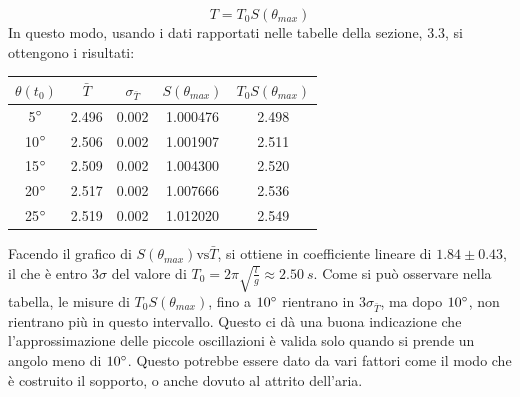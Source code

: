 \documentclass[a4paper]{article}
\begin{document}
\begin{equation}
    T = T_0 S(\theta_{max})
\end{equation}
In questo modo, usando i dati rapportati nelle tabelle della sezione, 3.3, si ottengono i risultati:

\begin{center}
    \begin{tabular}{|c|c|c|c|c|}
    \hline
   $\theta(t_0)$ & $\bar{T}$ & $\sigma_{\bar{T}}$ & $S(\theta_{max})$ & $T_0 S(\theta_{max})$ \\
    \hline
       5$\degree$ & 2.496 & 0.002 & 1.000476 & 2.498 \\
      10$\degree$ & 2.506 & 0.002 & 1.001907 & 2.511 \\
      15$\degree$ & 2.509 & 0.002 & 1.004300 & 2.520 \\
      20$\degree$ & 2.517 & 0.002 & 1.007666 & 2.536 \\
      25$\degree$ & 2.519 & 0.002 & 1.012020 & 2.549 \\
    \hline
    \end{tabular}
\end{center}

Facendo il grafico di $S(\theta_{max}) \text{vs} \bar{T}$, si ottiene in coefficiente lineare di $1.84\pm{0.43}$, il che è entro $3\sigma$ del valore di $T_0 = 2\pi \sqrt{\frac{l}{g}} \approx \SI{2.50}{s}$. 
Come si può osservare nella tabella, le misure di $T_0 S(\theta_{max})$, fino a $10\degree$ rientrano in $3\sigma_{\bar{T}}$, ma dopo $10\degree$, non rientrano più in questo intervallo. Questo ci dà una buona indicazione che l'approssimazione delle piccole oscillazioni è valida solo quando si prende un angolo meno di $10\degree$. Questo potrebbe essere dato da vari fattori come il modo che è costruito il sopporto, o anche dovuto al attrito dell'aria. 
\end{document}
